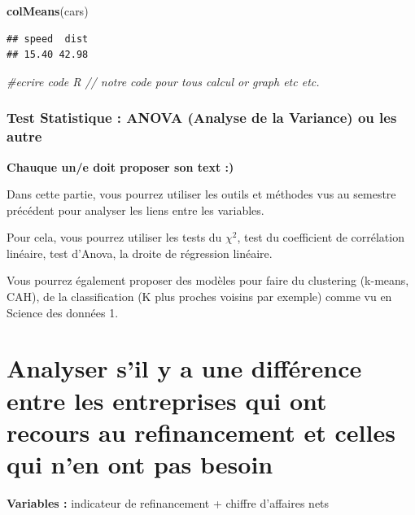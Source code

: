\documentclass[mstat,12pt]{unswthesis}
\newenvironment{Shaded}{\begin{snugshade}}{\end{snugshade}}
\newcommand{\CommentTok}[1]{\textcolor[rgb]{0.56,0.35,0.01}{\textit{#1}}}
\newcommand{\FunctionTok}[1]{\textcolor[rgb]{0.13,0.29,0.53}{\textbf{#1}}}
\newcommand{\NormalTok}[1]{#1}
\begin{document}
\begin{Shaded}
\begin{Highlighting}[]
\FunctionTok{colMeans}\NormalTok{(cars)}
\end{Highlighting}
\end{Shaded}

\begin{verbatim}
## speed  dist 
## 15.40 42.98
\end{verbatim}

\begin{Shaded}
\begin{Highlighting}[]
 \CommentTok{\#ecrire code R // notre code pour tous calcul or graph etc etc. }
\end{Highlighting}
\end{Shaded}

\subsubsection{Test Statistique : ANOVA (Analyse de la Variance) ou les
autre}\label{test-statistique-anova-analyse-de-la-variance-ou-les-autre}

\textbf{Chauque un/e doit proposer son text :) }

Dans cette partie, vous pourrez utiliser les outils et méthodes vus au
semestre précédent pour analyser les liens entre les variables.

Pour cela, vous pourrez utiliser les tests du \(\chi^2\), test du
coefficient de corrélation linéaire, test d'Anova, la droite de
régression linéaire.

Vous pourrez également proposer des modèles pour faire du clustering
(k-means, CAH), de la classification (K plus proches voisins par
exemple) comme vu en Science des données 1.

\newpage

\section{\texorpdfstring{\textbf{Analyser s'il y a une différence entre
les entreprises qui ont recours au refinancement et celles qui n'en ont
pas
besoin}}{Analyser s'il y a une différence entre les entreprises qui ont recours au refinancement et celles qui n'en ont pas besoin}}\label{analyser-sil-y-a-une-diffuxe9rence-entre-les-entreprises-qui-ont-recours-au-refinancement-et-celles-qui-nen-ont-pas-besoin}

\bigskip

\textbf{Variables :} indicateur de refinancement + chiffre d'affaires
nets
\end{document}
